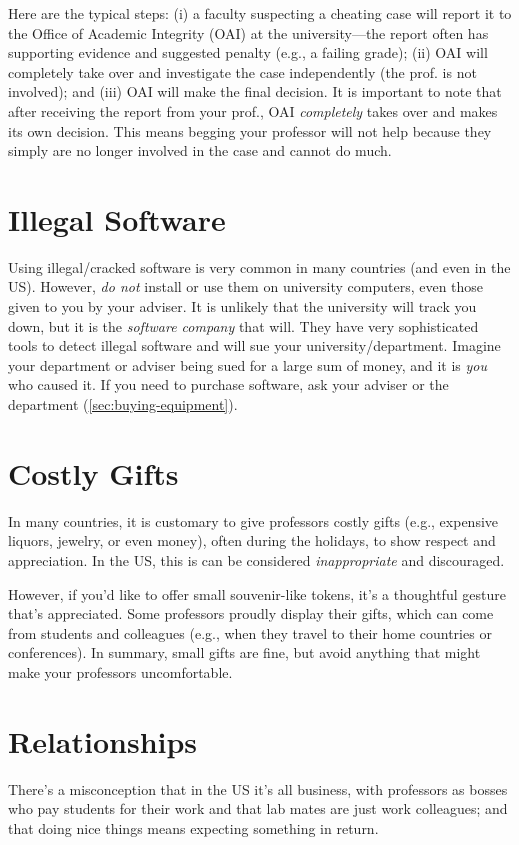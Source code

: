 \documentclass[oneside,11pt,dvipsnames]{book}
\begin{document}
Here are the typical steps: (i) a faculty suspecting a cheating case will report it to the Office of Academic Integrity (OAI) at the university---the report often has supporting evidence and suggested penalty (e.g., a failing grade);  (ii)  OAI will completely take over and investigate the case independently (the prof. is not involved); and (iii) OAI will make the final decision.  It is important to note that after receiving the report from your prof., OAI \emph{completely} takes over and makes its own decision.  This means begging your professor will not help because they simply are no longer involved in the case and cannot do much.

\section{Illegal Software}\label{sec:illegal-software}
 Using illegal/cracked software is very common in many countries (and even in the US). However, \emph{do not} install or use them on university computers, even those given to you by your adviser.  It is unlikely that the university will track you down, but it is the \emph{software company} that will.  They have very sophisticated tools to detect illegal software and will sue your university/department.  Imagine your department or adviser being sued for a large sum of money, and it is \emph{you} who caused it.  If you need to purchase software,  ask your adviser or the department (\autoref{sec:buying-equipment}).


\section{Costly Gifts}\label{sec:gifts} In many countries, it is customary to give professors costly gifts (e.g., expensive liquors, jewelry, or even money), often during the holidays, to show respect and appreciation.  In the US, this is can be considered \emph{inappropriate} and discouraged. 

However, if you'd like to offer small souvenir-like tokens, it's a thoughtful gesture that's appreciated. Some professors proudly display their gifts, which can come from students and colleagues (e.g., when they travel to their home countries or conferences). In summary, small gifts are fine, but avoid anything that might make your professors uncomfortable.


\section{Relationships}
There's a misconception that in the US it's all business, with professors as bosses who pay students for their work and that lab mates are just work colleagues; and that doing nice things means expecting something in return.
\end{document}
